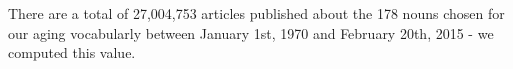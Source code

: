 There are a total of 27,004,753 articles published about the
178 nouns chosen for our aging vocabularly between January 1st, 1970
and February 20th, 2015 - we computed this value.
